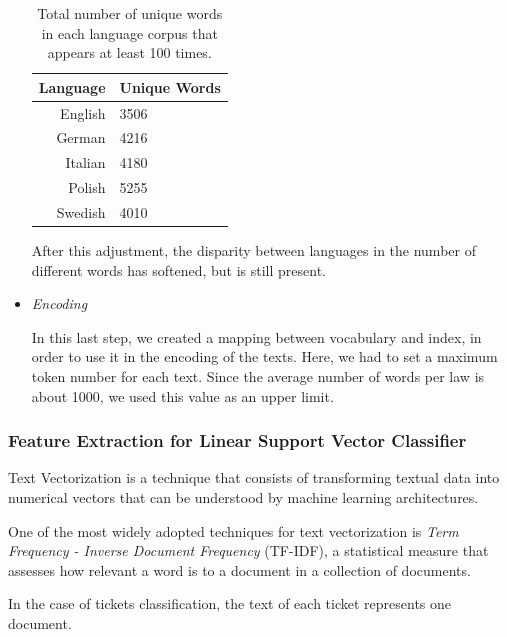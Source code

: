 \documentclass[letterpaper,11pt]{article}
\begin{document}
\begin{itemize}
  \begin{table}[H]
    \centering
    \begin{tabular}{@{}rl@{}}
    \toprule
    \multicolumn{1}{c}{\textbf{Language}} & \textbf{Unique Words} \\ \midrule
    English                               & 3506                   \\
    German                                & 4216                   \\
    Italian                               & 4180                   \\
    Polish                                & 5255                   \\
    Swedish                               & 4010                   \\ \bottomrule
    \end{tabular}
    \caption{Total number of unique words in each language corpus that appears at least 100 times.}
    \label{table:tot_words_for_corpuses_only_common}
    \end{table}

  After this adjustment, the disparity between languages in the number of different words has softened, but is still present.

  \item \textit{Encoding}
  
  In this last step, we created a mapping between vocabulary and index, in order to use it in the encoding of the texts. Here, we had to set a maximum token number for each text. Since the average number of words per law is about 1000, we used this value as an upper limit.


\end{itemize}


\subsubsection*{Feature Extraction for Linear Support Vector Classifier}

Text Vectorization is a technique that consists of transforming textual data into numerical vectors that can be understood by machine learning architectures.

One of the most widely adopted techniques for text vectorization is \textit{Term Frequency - Inverse Document Frequency} (TF-IDF), a statistical measure that assesses how relevant a word is to a document in a collection of documents.

In the case of tickets classification, the text of each ticket represents one document.
\end{document}
